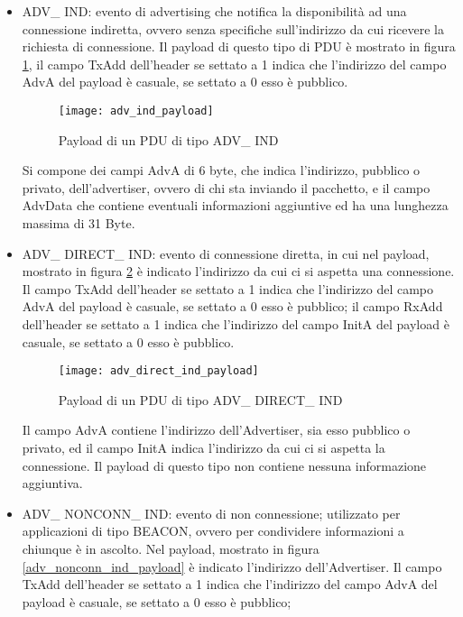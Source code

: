 \begin{itemize}
\item ADV\_ IND: evento di advertising che notifica la disponibilità ad una connessione indiretta, ovvero senza specifiche sull'indirizzo da cui ricevere la richiesta di connessione.
Il payload di questo tipo di PDU è mostrato in figura \ref{adv_ind_payload}, il campo TxAdd dell'header se settato a 1 indica che l'indirizzo del campo AdvA del payload è casuale, se settato a 0 esso è pubblico.

\begin{figure}[H]
\texttt{[image: adv\_ind\_payload]}
\centering
\caption{Payload di un PDU di tipo ADV\_ IND }
\label{adv_ind_payload}
\end{figure}

Si compone dei campi AdvA di 6 byte, che indica l'indirizzo, pubblico o privato, dell'advertiser, ovvero di chi sta inviando il pacchetto, e il campo AdvData che contiene eventuali informazioni aggiuntive ed ha una lunghezza massima di 31 Byte.

\item ADV\_ DIRECT\_ IND: evento di connessione diretta, in cui nel payload, mostrato in figura \ref{adv_direct_ind_payload} è indicato l'indirizzo da cui ci si aspetta una connessione. Il campo TxAdd dell'header se settato a 1 indica che l'indirizzo del campo AdvA del payload è casuale, se settato a 0 esso è pubblico;
il campo RxAdd dell'header se settato a 1 indica che l'indirizzo del campo InitA del payload è casuale, se settato a 0 esso è pubblico. 

\begin{figure}[H]
\texttt{[image: adv\_direct\_ind\_payload]}
\centering
\caption{Payload di un PDU di tipo ADV\_ DIRECT\_ IND }
\label{adv_direct_ind_payload}
\end{figure}

Il campo AdvA contiene l'indirizzo dell'Advertiser, sia esso pubblico o privato, ed il campo InitA indica l'indirizzo da cui ci si aspetta la connessione. Il payload di questo tipo non contiene nessuna informazione aggiuntiva.

\item ADV\_ NONCONN\_ IND: evento di non connessione; utilizzato per applicazioni di tipo BEACON, ovvero per condividere informazioni a chiunque è in ascolto. Nel  payload, mostrato in figura \ref{adv_nonconn_ind_payload} è indicato l'indirizzo dell'Advertiser. Il campo TxAdd dell'header se settato a 1 indica che l'indirizzo del campo AdvA del payload è casuale, se settato a 0 esso è pubblico;


\end{itemize}
